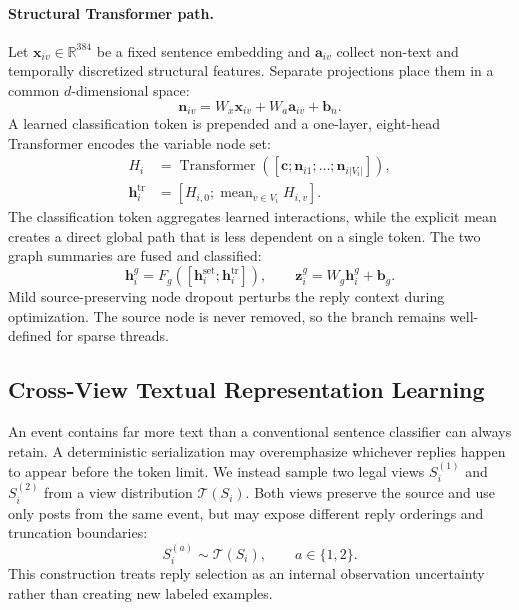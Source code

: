 \documentclass[sigconf,anonymous,review]{../acmart/acmart}
\newcommand{\mean}{\operatorname{mean}}
\begin{document}
\paragraph{Structural Transformer path.}
Let $\boldsymbol{x}_{iv}\in\mathbb{R}^{384}$ be a fixed sentence embedding and
$\boldsymbol{a}_{iv}$ collect non-text and temporally discretized structural
features.  Separate projections place them in a common $d$-dimensional space:
\begin{equation}
  \boldsymbol{n}_{iv}
  =W_x\boldsymbol{x}_{iv}+W_a\boldsymbol{a}_{iv}+\boldsymbol{b}_n.
  \label{eq:node-projection}
\end{equation}
A learned classification token is prepended and a one-layer, eight-head
Transformer encodes the variable node set:
\begin{align}
  H_i &=\operatorname{Transformer}
  ([\boldsymbol{c};\boldsymbol{n}_{i1};\ldots;
  \boldsymbol{n}_{i|V_i|}]),\\
  \boldsymbol{h}_i^{\mathrm{tr}}
  &=[H_{i,0};\mean_{v\in V_i}H_{i,v}].
  \label{eq:graph-transformer}
\end{align}
The classification token aggregates learned interactions, while the explicit
mean creates a direct global path that is less dependent on a single token.
The two graph summaries are fused and classified:
\begin{equation}
  \boldsymbol{h}_i^g
  =F_g([\boldsymbol{h}_i^{\mathrm{set}};
        \boldsymbol{h}_i^{\mathrm{tr}}]),\qquad
  \boldsymbol{z}_i^g=W_g\boldsymbol{h}_i^g+\boldsymbol{b}_g.
  \label{eq:graph-logits}
\end{equation}
Mild source-preserving node dropout perturbs the reply context during
optimization.  The source node is never removed, so the branch remains
well-defined for sparse threads.

\subsection{Cross-View Textual Representation Learning}
\label{sec:text}

An event contains far more text than a conventional sentence classifier can
always retain.  A deterministic serialization may overemphasize whichever
replies happen to appear before the token limit.  We instead sample two legal
views $S_i^{(1)}$ and $S_i^{(2)}$ from a view distribution
$\mathcal{T}(S_i)$.  Both views preserve the source and use only posts from
the same event, but may expose different reply orderings and truncation
boundaries:
\begin{equation}
  S_i^{(a)}\sim\mathcal{T}(S_i),\qquad a\in\{1,2\}.
  \label{eq:text-views}
\end{equation}
This construction treats reply selection as an internal observation
uncertainty rather than creating new labeled examples.
\end{document}
